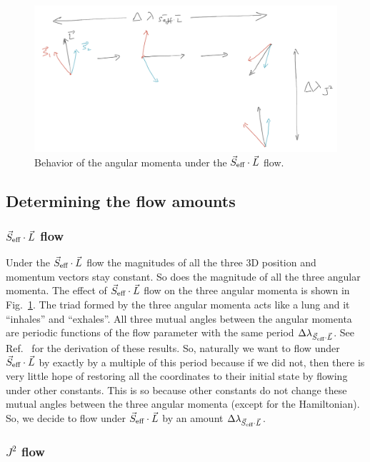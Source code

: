 \begin{figure}
  \centering
  \includegraphics[width=0.8\linewidth]{seffdl_flow}
  \caption{ Behavior of the angular momenta under 
  the $\vec{S}_{\text{eff}}\cdot \vec{L}$ flow.
    \vspace{-1.em}
  }
  \label{seffdl_flow}
\end{figure}


\subsection{Determining the flow amounts}







\subsubsection{$\vec{S}_{\text{eff}}\cdot \vec{L}$ flow}

Under the $\vec{S}_{\text{eff}}\cdot \vec{L}$ flow the magnitudes of all the three 3D position and 
momentum vectors stay constant. So does the magnitude of all the three
angular momenta. The effect of $\vec{S}_{\text{eff}}\cdot \vec{L}$ flow on the three angular momenta 
is shown in Fig.~\ref{seffdl_flow}. The triad formed by the three
angular momenta acts like a lung and it ``inhales'' and ``exhales''.
All three mutual angles between the angular momenta are periodic functions
of the flow parameter with the same period $\Delta \lambda_{\vec{S}_{\text{eff}}\cdot \vec{L}}$.
See Ref.~\cite{tanay2021action}
for the derivation of these results. So, naturally we want to flow 
under $\vec{S}_{\text{eff}}\cdot \vec{L}$ by exactly by a multiple of this period because if we 
did not, then there is very little hope of restoring all the coordinates
to their initial state by flowing under other constants. This
is so because other constants do not change these mutual angles
between the three angular momenta (except for the Hamiltonian).
So, we decide to flow under $\vec{S}_{\text{eff}}\cdot \vec{L}$ by an amount $\Delta \lambda_{\vec{S}_{\text{eff}}\cdot \vec{L}}$.




\subsubsection{$J^2$ flow}

